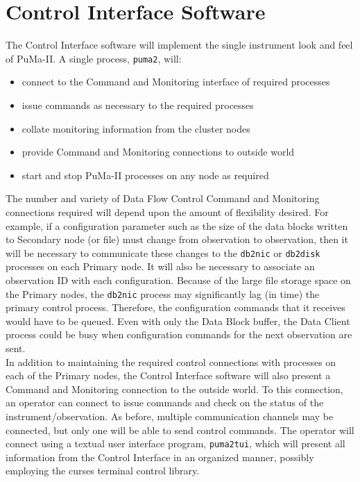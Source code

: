 \chapter{Control Interface Software}

The Control Interface software will implement the single instrument
look and feel of PuMa-II.  A single process, {\tt puma2}, will:

\begin{itemize}
\item connect to the Command and Monitoring interface of required processes
\vspace{-2mm}
\item issue commands as necessary to the required processes
\vspace{-2mm}
\item collate monitoring information from the cluster nodes
\vspace{-2mm}
\item provide Command and Monitoring connections to outside world
\vspace{-2mm}
\item start and stop PuMa-II processes on any node as required
\end{itemize}

The number and variety of Data Flow Control Command and Monitoring
connections required will depend upon the amount of flexibility
desired. For example, if a configuration parameter such as the size of
the data blocks written to Secondary node (or file) must change from
observation to observation, then it will be necessary to communicate
these changes to the {\tt db2nic} or {\tt db2disk} processes on each
Primary node.  It will also be necessary to associate an observation
ID with each configuration.  Because of the large file storage space
on the Primary nodes, the {\tt db2nic} process may significantly lag
(in time) the primary control process.  Therefore, the configuration
commands that it receives would have to be queued.  Even with only the
Data Block buffer, the Data Client process could be busy when
configuration commands for the next observation are sent. \\

In addition to maintaining the required control connections with
processes on each of the Primary nodes, the Control Interface software
will also present a Command and Monitoring connection to the outside
world.  To this connection, an operator can connect to issue commands
and check on the status of the instrument/observation.  As before,
multiple communication channels may be connected, but only one will be
able to send control commands.  The operator will connect using a
textual user interface program, {\tt puma2tui}, which will present all
information from the Control Interface in an organized manner,
possibly employing the curses terminal control library.

